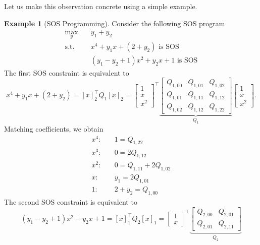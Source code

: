 \documentclass[
]{book}
\theoremstyle{definition}
\theoremstyle{definition}
\newtheorem{example}{Example}[chapter]
\theoremstyle{definition}
\theoremstyle{definition}
\theoremstyle{remark}
\begin{document}
Let us make this observation concrete using a simple example.

\begin{example}[SOS Programming]
\protect\hypertarget{exm:SOSProgram}{}\label{exm:SOSProgram}Consider the following SOS program
\begin{equation}
\begin{split} 
\max_y & \quad y_1 + y_2 \\
\mathrm{s.t.}& \quad x^4 + y_1 x + (2+y_2) \text{ is SOS}\\
& \quad (y_1 - y_2 + 1) x^2 + y_2 x + 1 \text{ is SOS}
\end{split}
\label{eq:SOS-program-example}
\end{equation}
The first SOS constraint is equivalent to
\[
x^4 + y_1 x + (2 + y_2) = [x]_2^\top Q_1 [x]_2 = \begin{bmatrix} 1 \\ x \\ x^2 \end{bmatrix}^\top
\underbrace{\begin{bmatrix}
Q_{1,00} & Q_{1,01} & Q_{1,02} \\
Q_{1,01} & Q_{1,11} & Q_{1,12} \\
Q_{1,02} & Q_{1,12} & Q_{1,22}
\end{bmatrix}}_{Q_1}
\begin{bmatrix} 1 \\ x \\ x^2 \end{bmatrix}.
\]
Matching coefficients, we obtain
\begin{equation}
\begin{split}
x^4: & \quad 1 = Q_{1,22} \\
x^3: & \quad 0 = 2 Q_{1,12} \\
x^2: & \quad 0 = Q_{1,11} + 2 Q_{1,02} \\
x: & \quad y_1 = 2 Q_{1,01} \\
1: & \quad 2 + y_2 = Q_{1,00}
\end{split}
\label{eq:SOS-program-constraint-1}
\end{equation}
The second SOS constraint is equivalent to
\[
(y_1 - y_2 + 1)x^2 + y_2 x + 1 = [x]_1^\top Q_2 [x]_1 = \begin{bmatrix} 1 \\ x \end{bmatrix}^\top
\underbrace{\begin{bmatrix} Q_{2,00} & Q_{2,01} \\
Q_{2,01} & Q_{2,11} \end{bmatrix}}_{Q_2}
\]
\end{example}
\end{document}

